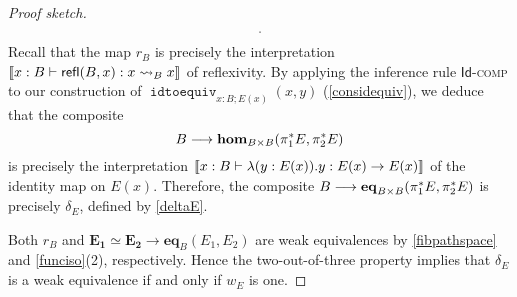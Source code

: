 \documentclass[10pt,letterpaper,cm]{nupset}
\theoremstyle{definition}
\theoremstyle{theorem}
\theoremstyle{remark}
\newcommand{\id}{\mathsf{Id}}
\newcommand{\refl}{\mathsf{refl}}
\newcommand{\0}{\mathbf{0}}
\newcommand{\1}{\mathbf{1}}
\newcommand{\2}{\mathbf{2}}
\DeclareMathOperator{\equiveq}{\mathtt{idtoequiv}}
\begin{document}
\begin{proof}[Proof sketch]
\[\begin{tikzcd}[column sep=large]
\end{tikzcd}.
\]
Recall that the map $r_B$ is precisely the interpretation $\mleft\llbracket{x:B \vdash \refl(B,x) : x\leadsto_B x}\mright\rrbracket$ of reflexivity. By applying the inference rule $\id$-\textsc{comp}  to our construction of $\equiveq_{{x:B}; E(x)}(x,y)$  (\cref{considequiv}), we deduce that the composite
\[
B\longrightarrow \mathbf{hom}_{B\times B}\mleft(\pi_1^{\ast}{E}, \pi_2^{\ast}{E}\mright) 
\] is precisely the interpretation $\mleft\llbracket{  x: B\vdash  \lambda(y:E(x) ).y: E(x) \to E(x) }\mright\rrbracket$ of the identity map on $E(x)$. Therefore, the composite $B\longrightarrow \mathbf{eq}_{B\times B}\mleft(\pi_1^{\ast}{E}, \pi_2^{\ast}{E}\mright) $  is precisely $\delta_E$, defined by \eqref{deltaE}. 

\medskip

Both $r_B$ and $\mathbf{E_1 \simeq E_2} \to \mathbf{eq}_B(E_1,E_2)$ are weak equivalences by \cref{fibpathspace} and \cref{funciso}(2), respectively. Hence the two-out-of-three property implies that $\delta_E$ is a weak equivalence if and only if $w_E$ is one. 
\end{proof}

\medskip
\end{document}
